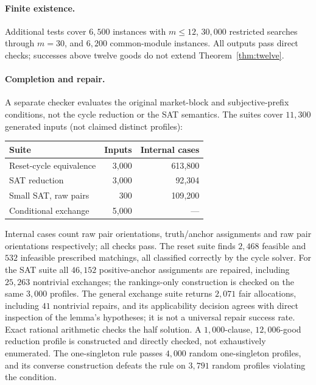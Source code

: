 \documentclass[11pt]{article}
\theoremstyle{definition}
\begin{document}
\paragraph{Finite existence.}
Additional tests cover $6{,}500$ instances with $m\le12$, $30{,}000$ restricted searches through $m=30$, and $6{,}200$ common-module instances. All outputs pass direct checks; successes above twelve goods do not extend Theorem~\ref{thm:twelve}.

\paragraph{Completion and repair.}
A separate checker evaluates the original market-block and subjective-prefix conditions, not the cycle reduction or the SAT semantics. The suites cover $11{,}300$ generated inputs (not claimed distinct profiles):
\begin{center}\small
\begin{tabular}{@{}p{}rr@{}}
\toprule
Suite & Inputs & Internal cases\\ \midrule
Reset-cycle equivalence & 3{,}000 & 613{,}800\\
SAT reduction & 3{,}000 & 92{,}304\\
Small SAT, raw pairs & 300 & 109{,}200\\
Conditional exchange & 5{,}000 & ---\\
\bottomrule
\end{tabular}
\end{center}
Internal cases count raw pair orientations, truth/anchor assignments and raw pair orientations respectively; all checks pass. The reset suite finds $2{,}468$ feasible and $532$ infeasible prescribed matchings, all classified correctly by the cycle solver. For the SAT suite all $46{,}152$ positive-anchor assignments are repaired, including $25{,}263$ nontrivial exchanges; the rankings-only construction is checked on the same $3{,}000$ profiles. The general exchange suite returns $2{,}071$ fair allocations, including $41$ nontrivial repairs, and its applicability decision agrees with direct inspection of the lemma's hypotheses; it is not a universal repair success rate. Exact rational arithmetic checks the half solution. A $1{,}000$-clause, $12{,}006$-good reduction profile is constructed and directly checked, not exhaustively enumerated. The one-singleton rule passes $4{,}000$ random one-singleton profiles, and its converse construction defeats the rule on $3{,}791$ random profiles violating the condition.
\end{document}
